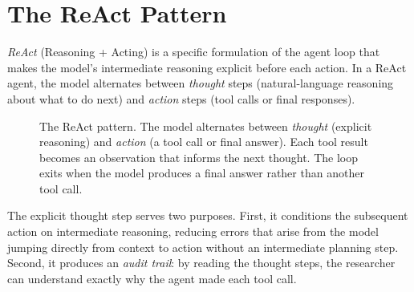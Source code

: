 \section{The ReAct Pattern}
\label{section:ReAct}

\emph{ReAct} (Reasoning + Acting) is a specific formulation of the agent loop that makes the model's intermediate reasoning explicit before each action.
In a ReAct agent, the model alternates between \emph{thought} steps (natural-language reasoning about what to do next) and \emph{action} steps (tool calls or final responses).

\begin{figure}[htb!]
\begin{center}
\caption{The ReAct pattern.
The model alternates between \emph{thought} (explicit reasoning) and \emph{action} (a tool call or final answer).
Each tool result becomes an observation that informs the next thought.
The loop exits when the model produces a final answer rather than another tool call.}
\label{figure:ReAct}
\end{center}
\end{figure}

The explicit thought step serves two purposes.
First, it conditions the subsequent action on intermediate reasoning, reducing errors that arise from the model jumping directly from context to action without an intermediate planning step.
Second, it produces an \emph{audit trail}: by reading the thought steps, the researcher can understand exactly why the agent made each tool call.

